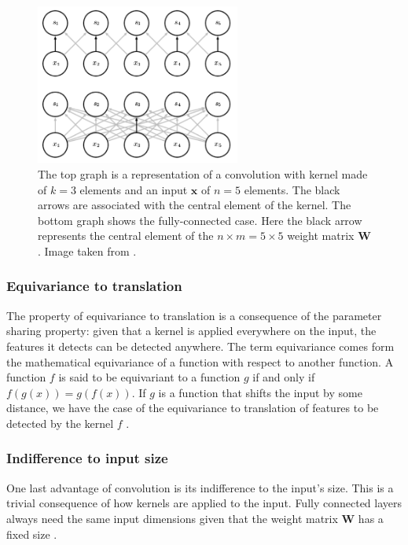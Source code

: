 \begin{figure}[!h]
    \centering
    \includegraphics[width=0.6\textwidth]{ParamSharing.png}
    \caption{The top graph is a representation of a convolution with kernel made of $k=3$ elements and an input $\bm{x}$ of $n = 5$ elements. The black arrows are associated with the central element of the kernel. The bottom graph shows the fully-connected case. Here the black arrow represents the central element of the $n \times m = 5 \times 5$ weight matrix $\bm{W}$. Image taken from \citet{Goodfellow2016}.}
    \label{fig:ParamSharing}
\end{figure}

\subsubsection{Equivariance to translation}
The property of equivariance to translation is a consequence of the parameter sharing property: given that a kernel is applied everywhere on the input, the features it detects can be detected anywhere. The term equivariance comes form the mathematical equivariance of a function with respect to another function. A function $f$ is said to be equivariant to a function $g$ if and only if $f(g(x))=g(f(x))$. If $g$ is a function that shifts the input by some distance, we have the case of the equivariance to translation of features to be detected by the kernel $f$ \citep{Goodfellow2016}.

\subsubsection{Indifference to input size}
One last advantage of convolution is its indifference to the input's size. This is a trivial consequence of how kernels are applied to the input. Fully connected layers always need the same input dimensions given that the weight matrix $\bm{W}$ has a fixed size \citep{Goodfellow2016}.

